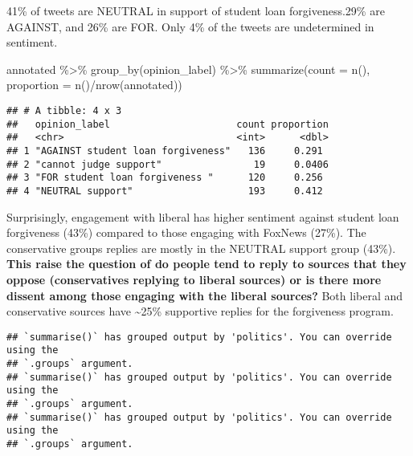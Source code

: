 \documentclass[
]{article}
\newenvironment{Shaded}{\begin{snugshade}}{\end{snugshade}}
\newcommand{\AttributeTok}[1]{\textcolor[rgb]{0.77,0.63,0.00}{#1}}
\newcommand{\FunctionTok}[1]{\textcolor[rgb]{0.00,0.00,0.00}{#1}}
\newcommand{\NormalTok}[1]{#1}
\newcommand{\SpecialCharTok}[1]{\textcolor[rgb]{0.00,0.00,0.00}{#1}}
\begin{document}
41\% of tweets are NEUTRAL in support of student loan forgiveness.29\%
are AGAINST, and 26\% are FOR. Only 4\% of the tweets are undetermined
in sentiment.

\begin{Shaded}
\begin{Highlighting}[]
\NormalTok{annotated }\SpecialCharTok{\%\textgreater{}\%} \FunctionTok{group\_by}\NormalTok{(opinion\_label) }\SpecialCharTok{\%\textgreater{}\%} \FunctionTok{summarize}\NormalTok{(}\AttributeTok{count =} \FunctionTok{n}\NormalTok{(), }\AttributeTok{proportion =} \FunctionTok{n}\NormalTok{()}\SpecialCharTok{/}\FunctionTok{nrow}\NormalTok{(annotated))}
\end{Highlighting}
\end{Shaded}

\begin{verbatim}
## # A tibble: 4 x 3
##   opinion_label                      count proportion
##   <chr>                              <int>      <dbl>
## 1 "AGAINST student loan forgiveness"   136     0.291 
## 2 "cannot judge support"                19     0.0406
## 3 "FOR student loan forgiveness "      120     0.256 
## 4 "NEUTRAL support"                    193     0.412
\end{verbatim}

Surprisingly, engagement with liberal has higher sentiment against
student loan forgiveness (43\%) compared to those engaging with FoxNews
(27\%). The conservative groups replies are mostly in the NEUTRAL
support group (43\%). \textbf{This raise the question of do people tend
to reply to sources that they oppose (conservatives replying to liberal
sources) or is there more dissent among those engaging with the liberal
sources?} Both liberal and conservative sources have \textasciitilde25\%
supportive replies for the forgiveness program.

\begin{verbatim}
## `summarise()` has grouped output by 'politics'. You can override using the
## `.groups` argument.
## `summarise()` has grouped output by 'politics'. You can override using the
## `.groups` argument.
## `summarise()` has grouped output by 'politics'. You can override using the
## `.groups` argument.
\end{verbatim}
\end{document}
